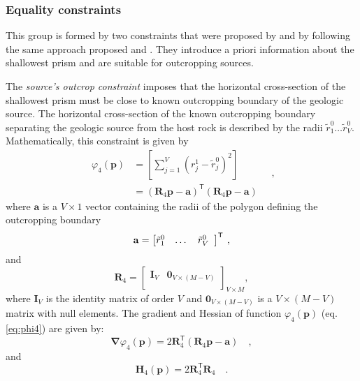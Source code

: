 \subsubsection{Equality constraints}

This group is formed by two constraints that were proposed by \cite{oliveirajr-etal2011} and \cite{oliveirajr-barbosa2013} by following the same approach proposed \cite{barbosa-etal1997} and \cite{barbosa-1999a}. 
They introduce a priori information about the shallowest prism and are suitable for outcropping sources.

The \textit{source’s outcrop constraint} imposes that the horizontal cross-section of the shallowest prism must be close to known outcropping boundary of the geologic source.
The horizontal cross-section of the known outcropping boundary separating the geologic source from the host rock is described by the radii $\tilde{r}_{1}^{0} \dots \tilde{r}_{V}^{0}$. Mathematically, this constraint is given by
\begin{equation}\label{eq:phi4}
\begin{split}
\varphi_{4}(\mathbf{p}) &= \left[ \sum\limits^{V}_{j=1}\left(r^{1}_{j}-\tilde{r}^{0}_{j}\right)^2\right] \\
&= \left(\mathbf{R}_{4} \mathbf{p} - \mathbf{a} \right)^{\mathsf{T}} 
\left(\mathbf{R}_{4} \mathbf{p} - \mathbf{a} \right)
\end{split} \quad ,
\end{equation}
where $\mathbf{a}$ is a $V \times 1$ vector containing the radii of the polygon defining the outcropping boundary
\begin{equation}
\mathbf{a} = \left[ \begin{array}{@{}*{12}{c}@{}}
\tilde{r}_{1}^{0} & \dots & \tilde{r}_{V}^{0} \\
\end{array} \right]^{\mathsf{T}} \: ,
\label{eq:a-vector}
\end{equation}
and
\begin{equation}
\mathbf{R}_{4} = 
\begin{bmatrix}
\mathbf{I}_{V} & \mathbf{0}_{V \times (M-V)} \\
\end{bmatrix}_{V\times M},
\label{eq:R4-matrix}
\end{equation}
where $\mathbf{I}_{V}$ is the identity matrix of order $V$ and 
$\mathbf{0}_{V \times (M-V)}$ is a $V \times (M-V)$ matrix with null elements.
The gradient and Hessian of function $\varphi_{4}(\mathbf{p})$ (eq. \ref{eq:phi4}) are given by:
\begin{equation}\label{eq:phi4_grad}
\boldsymbol{\nabla}\varphi_{4}(\mathbf{p}) = 2 \mathbf{R}_{4}^{\mathsf{T}} 
\left(\mathbf{R}_{4} \mathbf{p} - \mathbf{a} \right) \quad ,
\end{equation}
and
\begin{equation}\label{eq:phi4_hessian}
\mathbf{H}_{4}(\mathbf{p}) = 2 \mathbf{R}^{\mathsf{T}}_{4}\mathbf{R}_{4} \quad .
\end{equation}

